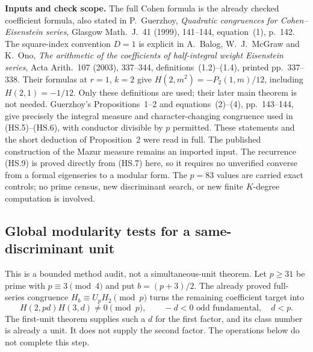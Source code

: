 \documentclass[11pt,a4paper]{article}
\theoremstyle{definition}
\renewcommand{\paragraph}[1]{\par\smallskip\noindent\textbf{#1}\quad\ignorespaces}
\begin{document}
\paragraph{Inputs and check scope.}
The full Cohen formula is the already checked coefficient
formula, also stated in P.~Guerzhoy,
\emph{Quadratic congruences for Cohen--Eisenstein series},
Glasgow Math.~J.~41 (1999), 141--144, equation~(1), p.~142.
The square-index convention $D=1$ is explicit in
A.~Balog, W.~J.~McGraw and K.~Ono,
\emph{The arithmetic of the coefficients of half-integral weight
Eisenstein series}, Acta Arith.~107 (2003), 337--344,
definitions~(1.2)--(1.4), printed pp.~337--338.
Their formulas at $r=1$, $k=2$ give
$H(2,m^2)=-P_2(1,m)/12$, including $H(2,1)=-1/12$.
Only these definitions are used; their later main theorem
is not needed.
Guerzhoy's Propositions~1--2 and equations~(2)--(4), pp.~143--144,
give precisely the integral measure and character-changing
congruence used in (HS.5)--(HS.6), with conductor divisible
by $p$ permitted.
These statements and the short deduction of Proposition~2 were
read in full.  The published construction of the Mazur measure
remains an imported input.
The recurrence (HS.9) is proved directly from (HS.7) here,
so it requires no unverified converse from a formal eigenseries
to a modular form.
The $p=83$ values are carried exact controls; no prime census,
new discriminant search, or new finite $K$-degree computation
is involved.



\subsection{Global modularity tests for a same-discriminant unit}
\label{sec:hadamard-modularity-scope}

This is a bounded method audit, not a simultaneous-unit theorem.  Let
$p\ge31$ be prime with $p\equiv3\pmod4$ and put $b=(p+3)/2$.
The already proved full-series congruence
$H_b\equiv U_pH_2\pmod p$ turns the remaining coefficient target into
\[
 H(2,pd)H(3,d)\ne0\pmod p,
 \qquad -d<0\text{ odd fundamental},\quad d<p.
 \tag{HM.1}
\]
The first-unit theorem supplies such a $d$ for the first factor, and its
class number is already a unit.  It does not supply the second factor.
The operations below do not complete this step.
\end{document}
